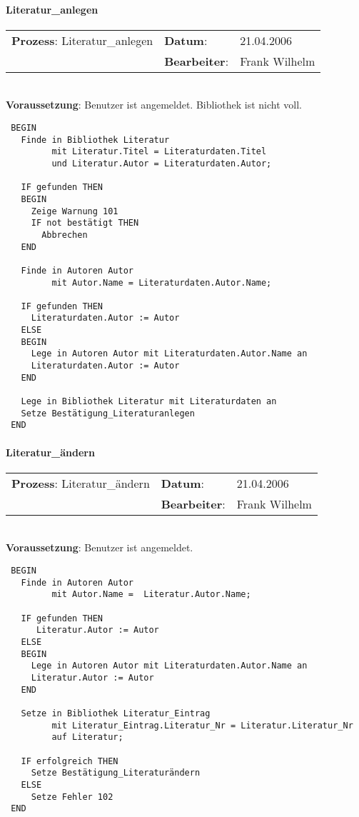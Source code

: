 \paragraph{Literatur\_anlegen}
\begin{tabular}[t]{p{9.5cm}ll}
\textbf{Prozess}: Literatur\_anlegen  	&\textbf{Datum}:      &21.04.2006\\
					&\textbf{Bearbeiter}: &Frank Wilhelm\\
\end{tabular}

\hrulefill\\
\textbf{Voraussetzung}: Benutzer ist angemeldet. Bibliothek ist nicht voll.
\begin{verbatim}
 BEGIN
   Finde in Bibliothek Literatur
         mit Literatur.Titel = Literaturdaten.Titel
         und Literatur.Autor = Literaturdaten.Autor;
 
   IF gefunden THEN
   BEGIN
     Zeige Warnung 101
     IF not bestätigt THEN
       Abbrechen
   END
   
   Finde in Autoren Autor
         mit Autor.Name = Literaturdaten.Autor.Name;
         
   IF gefunden THEN
     Literaturdaten.Autor := Autor
   ELSE
   BEGIN
     Lege in Autoren Autor mit Literaturdaten.Autor.Name an
     Literaturdaten.Autor := Autor
   END
   
   Lege in Bibliothek Literatur mit Literaturdaten an
   Setze Bestätigung_Literaturanlegen
 END
\end{verbatim}
\hrulefill



\paragraph{Literatur\_ändern}
\begin{tabular}[t]{p{9.5cm}ll}
\textbf{Prozess}: Literatur\_ändern  	&\textbf{Datum}:      &21.04.2006\\
					&\textbf{Bearbeiter}: &Frank Wilhelm\\
\end{tabular}

\hrulefill\\
\textbf{Voraussetzung}: Benutzer ist angemeldet.
\begin{verbatim}
 BEGIN
   Finde in Autoren Autor
         mit Autor.Name =  Literatur.Autor.Name;
         
   IF gefunden THEN
      Literatur.Autor := Autor
   ELSE
   BEGIN
     Lege in Autoren Autor mit Literaturdaten.Autor.Name an
     Literatur.Autor := Autor
   END
   
   Setze in Bibliothek Literatur_Eintrag
         mit Literatur_Eintrag.Literatur_Nr = Literatur.Literatur_Nr
         auf Literatur;
  
   IF erfolgreich THEN
     Setze Bestätigung_Literaturändern
   ELSE
     Setze Fehler 102
 END
\end{verbatim}
\hrulefill



